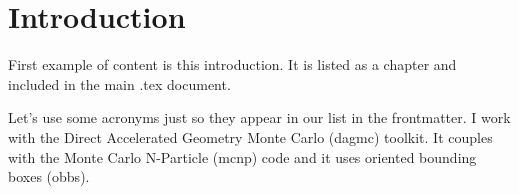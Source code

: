 \chapter{Introduction}

First example of content is this introduction.
It is listed as a chapter and included in the main .tex document.

Let's use some acronyms just so they appear in our list in the 
frontmatter. I work with the Direct Accelerated Geometry Monte Carlo
(\ac{dagmc}) toolkit. It couples with the Monte Carlo N-Particle (\ac{mcnp}) code and it uses oriented bounding boxes (\ac{obb}s).

\lipsum
